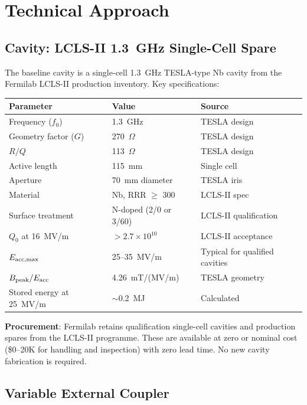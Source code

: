 \documentclass[11pt]{article}
\newcommand{\ee}[1]{\times 10^{#1}}
\newcommand{\Qzero}{Q_0}
\begin{document}
\section{Technical Approach}
\label{sec:technical}

\subsection{Cavity: LCLS-II 1.3~GHz Single-Cell Spare}

The baseline cavity is a single-cell 1.3~GHz TESLA-type Nb cavity
from the Fermilab LCLS-II production inventory. Key specifications:

\begin{center}
\begin{tabular}{lll}
\toprule
Parameter & Value & Source \\
\midrule
Frequency ($f_0$) & 1.3~GHz & TESLA design \\
Geometry factor ($G$) & 270~$\Omega$ & TESLA design \\
$R/Q$ & 113~$\Omega$ & TESLA design \\
Active length & 115~mm & Single cell \\
Aperture & 70~mm diameter & TESLA iris \\
Material & Nb, RRR $\geq$ 300 & LCLS-II spec \\
Surface treatment & N-doped (2/0 or 3/60) & LCLS-II qualification \\
$\Qzero$ at 16~MV/m & $> 2.7\ee{10}$ & LCLS-II acceptance \\
$E_{\rm acc,max}$ & 25--35~MV/m & Typical for qualified cavities \\
$B_{\rm peak}/E_{\rm acc}$ & 4.26~mT/(MV/m) & TESLA geometry \\
Stored energy at 25~MV/m & $\sim$0.2~MJ & Calculated \\
\bottomrule
\end{tabular}
\end{center}

\textbf{Procurement}: Fermilab retains qualification single-cell
cavities and production spares from the LCLS-II programme.
These are available at zero or nominal cost (\$0--20K for handling
and inspection) with zero lead time. No new cavity fabrication
is required.

\subsection{Variable External Coupler}
\end{document}
